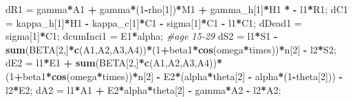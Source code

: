 \documentclass[
]{article}
\newenvironment{Shaded}{\begin{snugshade}}{\end{snugshade}}
\newcommand{\CommentTok}[1]{\textcolor[rgb]{0.56,0.35,0.01}{\textit{#1}}}
\newcommand{\DecValTok}[1]{\textcolor[rgb]{0.00,0.00,0.81}{#1}}
\newcommand{\KeywordTok}[1]{\textcolor[rgb]{0.13,0.29,0.53}{\textbf{#1}}}
\newcommand{\NormalTok}[1]{#1}
\newcommand{\OperatorTok}[1]{\textcolor[rgb]{0.81,0.36,0.00}{\textbf{#1}}}
\newcommand{\StringTok}[1]{\textcolor[rgb]{0.31,0.60,0.02}{#1}}
\begin{document}
\begin{Shaded}
\begin{Highlighting}[]
\NormalTok{    dR1 =}\StringTok{ }\NormalTok{gamma}\OperatorTok{*}\NormalTok{A1 }\OperatorTok{+}\StringTok{ }\NormalTok{gamma}\OperatorTok{*}\NormalTok{(}\DecValTok{1}\OperatorTok{-}\NormalTok{rho[}\DecValTok{1}\NormalTok{])}\OperatorTok{*}\NormalTok{M1 }\OperatorTok{+}\StringTok{ }\NormalTok{gamma_h[}\DecValTok{1}\NormalTok{]}\OperatorTok{*}\NormalTok{H1 }\OperatorTok{*}\StringTok{ }\OperatorTok{-}\StringTok{ }\NormalTok{l1}\OperatorTok{*}\NormalTok{R1;}
\NormalTok{    dC1 =}\StringTok{ }\NormalTok{kappa_h[}\DecValTok{1}\NormalTok{]}\OperatorTok{*}\NormalTok{H1 }\OperatorTok{-}\StringTok{ }\NormalTok{kappa_c[}\DecValTok{1}\NormalTok{]}\OperatorTok{*}\NormalTok{C1 }\OperatorTok{-}\StringTok{ }\NormalTok{sigma[}\DecValTok{1}\NormalTok{]}\OperatorTok{*}\NormalTok{C1 }\OperatorTok{-}\StringTok{ }\NormalTok{l1}\OperatorTok{*}\NormalTok{C1;}
\NormalTok{    dDead1 =}\StringTok{ }\NormalTok{sigma[}\DecValTok{1}\NormalTok{]}\OperatorTok{*}\NormalTok{C1;}
\NormalTok{    dcumInci1 =}\StringTok{ }\NormalTok{E1}\OperatorTok{*}\NormalTok{alpha;}
  \CommentTok{#age 15-29}
\NormalTok{    dS2 =}\StringTok{ }\NormalTok{l1}\OperatorTok{*}\NormalTok{S1 }\OperatorTok{-}\StringTok{ }\KeywordTok{sum}\NormalTok{(BETA[}\DecValTok{2}\NormalTok{,]}\OperatorTok{*}\KeywordTok{c}\NormalTok{(A1,A2,A3,A4))}\OperatorTok{*}\NormalTok{(}\DecValTok{1}\OperatorTok{+}\NormalTok{beta1}\OperatorTok{*}\KeywordTok{cos}\NormalTok{(omega}\OperatorTok{*}\NormalTok{times))}\OperatorTok{*}\NormalTok{n[}\DecValTok{2}\NormalTok{] }\OperatorTok{-}\StringTok{ }\NormalTok{l2}\OperatorTok{*}\NormalTok{S2;}
\NormalTok{    dE2 =}\StringTok{ }\NormalTok{l1}\OperatorTok{*}\NormalTok{E1 }\OperatorTok{+}\StringTok{ }\KeywordTok{sum}\NormalTok{(BETA[}\DecValTok{2}\NormalTok{,]}\OperatorTok{*}\KeywordTok{c}\NormalTok{(A1,A2,A3,A4))}\OperatorTok{*}\NormalTok{(}\DecValTok{1}\OperatorTok{+}\NormalTok{beta1}\OperatorTok{*}\KeywordTok{cos}\NormalTok{(omega}\OperatorTok{*}\NormalTok{times))}\OperatorTok{*}\NormalTok{n[}\DecValTok{2}\NormalTok{] }\OperatorTok{-}\StringTok{ }\NormalTok{E2}\OperatorTok{*}\NormalTok{(alpha}\OperatorTok{*}\NormalTok{theta[}\DecValTok{2}\NormalTok{] }\OperatorTok{-}\StringTok{ }\NormalTok{alpha}\OperatorTok{*}\NormalTok{(}\DecValTok{1}\OperatorTok{-}\NormalTok{theta[}\DecValTok{2}\NormalTok{])) }\OperatorTok{-}\StringTok{ }\NormalTok{l2}\OperatorTok{*}\NormalTok{E2;}
\NormalTok{    dA2 =}\StringTok{ }\NormalTok{l1}\OperatorTok{*}\NormalTok{A1 }\OperatorTok{+}\StringTok{ }\NormalTok{E2}\OperatorTok{*}\NormalTok{alpha}\OperatorTok{*}\NormalTok{theta[}\DecValTok{2}\NormalTok{] }\OperatorTok{-}\StringTok{ }\NormalTok{gamma}\OperatorTok{*}\NormalTok{A2 }\OperatorTok{-}\StringTok{ }\NormalTok{l2}\OperatorTok{*}\NormalTok{A2;}

\end{Highlighting}
\end{Shaded}
\end{document}
